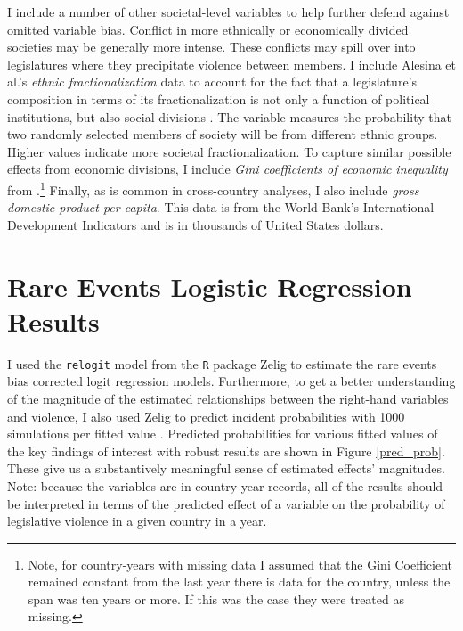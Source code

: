 \documentclass[a4paper]{article}\usepackage[]{graphicx}\usepackage[]{color}
\begin{document}
I include a number of other societal-level variables to help further defend against omitted variable bias. Conflict in more ethnically or economically divided societies may be generally more intense. These conflicts may spill over into legislatures where they precipitate violence between members. I include Alesina et al.'s \citeyearpar{Alesina2003} {\emph{ethnic fractionalization}} data to account for the fact that a legislature's composition in terms of its fractionalization is not only a function of political institutions, but also social divisions \citep{Neto1997, Mozaffar2003}. The variable measures the probability that two randomly selected members of society will be from different ethnic groups. Higher values indicate more societal fractionalization. To capture similar possible effects from economic divisions, I include {\emph{Gini coefficients of economic inequality}} from \cite{UNU2008}.\footnote{Note, for country-years with missing data I assumed that the Gini Coefficient remained constant from the last year there is data for the country, unless the span was ten years or more. If this was the case they were treated as missing.} Finally, as is common in cross-country analyses, I also include {\emph{gross domestic product per capita}}. This data is from the World Bank's International Development Indicators \citeyearpar{WorldBank2011} and is in thousands of United States dollars.



\section{Rare Events Logistic Regression Results}

I used the {\tt{relogit}} model from the {\tt{R}} package Zelig \citep{IMAIKingZelig2008} to estimate the rare events bias corrected logit regression models. Furthermore, to get a better understanding of the magnitude of the estimated relationships between the right-hand variables and violence, I also used Zelig to predict incident probabilities with 1000 simulations per fitted value \citep[see][]{King2002}. Predicted probabilities for various fitted values of the key findings of interest with robust results are shown in Figure \ref{pred_prob}. These give us a substantively meaningful sense of estimated effects' magnitudes. Note: because the variables are in country-year records, all of the results should be interpreted in terms of the predicted effect of a variable on the probability of legislative violence in a given country in a year.
\end{document}
